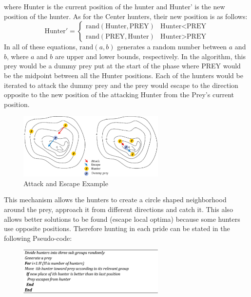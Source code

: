 where Hunter is the current position of the hunter and Hunter' is the new position of the hunter.
As for the Center hunters, their new position is as follows:
\[ \text{Hunter}' =  \begin{cases}
      \text{rand}(\text{Hunter}, \text{PREY}) & \text{Hunter} < \text{PREY} \\
      \text{rand}(\text{PREY}, \text{Hunter}) & \text{Hunter} > \text{PREY}
   \end{cases}
\]
In all of these equations, $\text{rand}(a,b)$ generates a random number between $a$ and $b$, where $a$ and $b$ are upper and lower bounds, respectively.
In the algorithm, this prey would be a dummy prey put at the start of the phase where PREY would be the midpoint between all the Hunter positions. Each of the hunters would be iterated to attack the dummy prey and the prey would escape to the direction opposite to the new position of the attacking Hunter from the Prey's current position.
\begin{figure}[h]
\begin{center}
\includegraphics[width=0.65\textwidth]{img/pa/hunting_attack}
\caption{Attack and Escape Example}
\end{center}
\end{figure}
This mechanism allows the hunters to create a circle shaped neighborhood around the prey, approach it from different directions and catch it. This also allows better solutions to be found (escape local optima) because some hunters use opposite positions.
Therefore hunting in each pride can be stated in the following Pseudo-code:
\begin{figure}[h]
\begin{center}
\includegraphics[width=0.65\textwidth]{img/pa/hunting_pseudo}
\end{center}
\end{figure}


